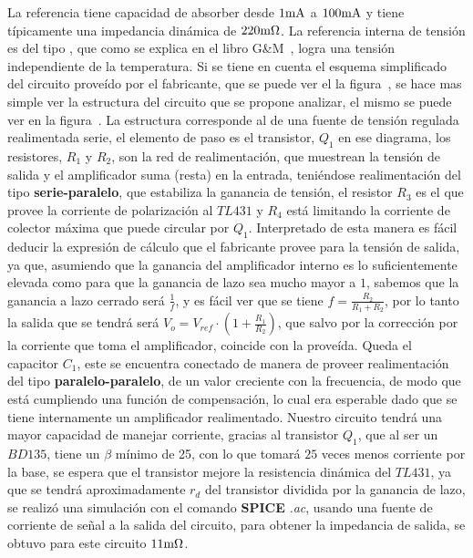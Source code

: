 La referencia tiene capacidad de absorber desde $1 \si[per-mode=symbol]{\milli\ampere}$ a $100 \si[per-mode=symbol]{\milli\ampere}$ y tiene típicamente una impedancia dinámica de $220 \si[per-mode=symbol]{\milli\ohm}$. La referencia interna de tensión es del tipo , que como se explica en el libro G\&M~\cite{Gray_Meyer5}, logra una tensión independiente de la temperatura. Si se tiene en cuenta el esquema simplificado del circuito proveído por el fabricante, que se puede ver el la figura~, se hace mas simple ver la estructura del circuito que se propone analizar, el mismo se puede ver en la figura~. La estructura corresponde al de una fuente de tensión regulada realimentada serie, el elemento de paso es el transistor, $Q_{1}$ en ese diagrama, los resistores, $R_{1}$ y $R_{2}$, son la red de realimentación, que muestrean la tensión de salida y el amplificador suma (resta) en la entrada, teniéndose realimentación del tipo \textbf{serie-paralelo}, que estabiliza la ganancia de tensión, el resistor $R_{3}$ es el que provee la corriente de polarización al $TL431$ y $R_{4}$ está limitando la corriente de colector máxima que puede circular por $Q_{1}$. Interpretado de esta manera es fácil deducir la expresión de cálculo que el fabricante provee para la tensión de salida, ya que, asumiendo que la ganancia del amplificador interno es lo suficientemente elevada como para que la ganancia de lazo sea mucho mayor a $1$, sabemos que la ganancia a lazo cerrado será $\frac{1}{f}$, y es fácil ver que se tiene $f = \frac{R_{2}}{R_{1} + R_{2}}$, por lo tanto la salida que se tendrá será $V_{o} = V_{ref} \cdot \left(1 +  \frac{R_{1}}{R_{2}} \right)$, que salvo por la corrección por la corriente que toma el amplificador, coincide con la proveída. Queda el capacitor $C_{1}$, este se encuentra conectado de manera de proveer realimentación del tipo \textbf{paralelo-paralelo}, de un valor creciente con la frecuencia, de modo que está cumpliendo una función de compensación, lo cual era esperable dado que se tiene internamente un amplificador realimentado. Nuestro circuito tendrá una mayor capacidad de manejar corriente, gracias al transistor $Q_{1}$, que al ser un $BD135$, tiene un $\beta$ mínimo de 25, con lo que tomará $25$ veces menos corriente por la base, se espera que el transistor mejore la resistencia dinámica del $TL431$, ya que se tendrá aproximadamente $r_{d}$ del transistor dividida por la ganancia de lazo, se realizó una simulación con el comando \textbf{SPICE} \textit{.ac}, usando una fuente de corriente de señal a la salida del circuito, para obtener la impedancia de salida, se obtuvo para este circuito $11 \si[per-mode=symbol]{\milli\ohm}$.
